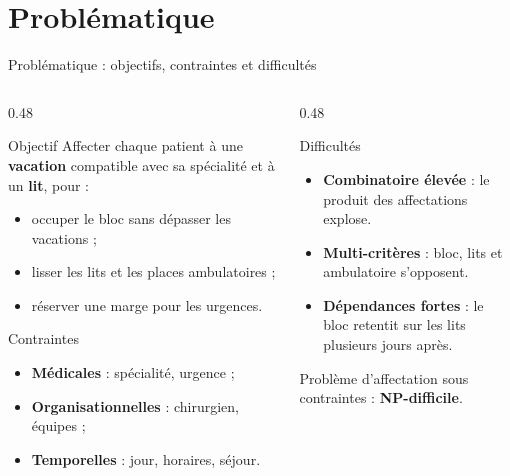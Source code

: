 \section{Problématique}

\begin{frame}{Problématique : objectifs, contraintes et difficultés}
  \footnotesize
  \begin{columns}[T,onlytextwidth]
    \begin{column}{0.48\textwidth}
      \begin{block}{Objectif}
        Affecter chaque patient à une \textbf{vacation} compatible avec sa
        spécialité et à un \textbf{lit}, pour :
        \begin{itemize}
          \item occuper le bloc sans dépasser les vacations ;
          \item lisser les lits et les places ambulatoires ;
          \item réserver une marge pour les urgences.
        \end{itemize}
      \end{block}
      \begin{block}{Contraintes}
        \begin{itemize}
          \item \textbf{Médicales} : spécialité, urgence ;
          \item \textbf{Organisationnelles} : chirurgien, équipes ;
          \item \textbf{Temporelles} : jour, horaires, séjour.
        \end{itemize}
      \end{block}
    \end{column}
    \begin{column}{0.48\textwidth}
      \begin{alertblock}{Difficultés}
        \begin{itemize}
          \item \textbf{Combinatoire élevée} : le produit des affectations
            explose.
          \item \textbf{Multi-critères} : bloc, lits et ambulatoire
            s'opposent.
          \item \textbf{Dépendances fortes} : le bloc retentit sur les lits
            plusieurs jours après.
        \end{itemize}
      \end{alertblock}
      \begin{center}
        Problème d'affectation sous contraintes : \textbf{NP-difficile}.
      \end{center}
    \end{column}
  \end{columns}
\end{frame}

